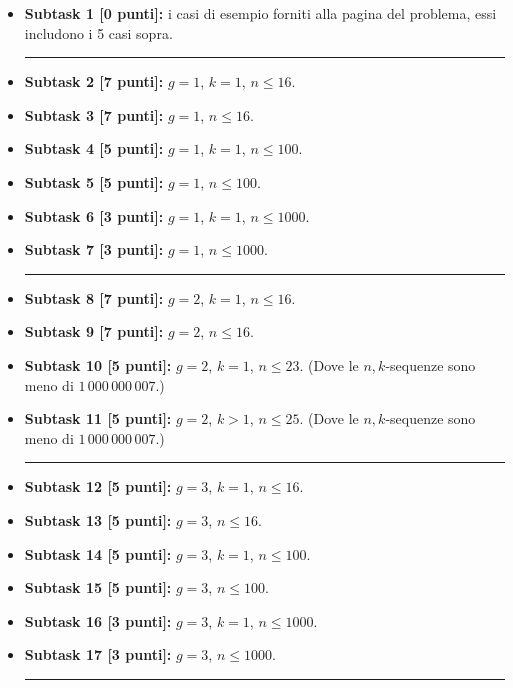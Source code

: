   \begin{itemize}
  \item \textbf{Subtask 1 [0 punti]:} i casi di esempio forniti alla pagina del problema, essi includono i 5 casi sopra.
      \vspace{-0.6cm}
       \begin{center}
      \rule{0.5\textwidth}{0.4pt} \hfill  \hfill \hfill
       \end{center}
      \vspace{-0.6cm}      
    \item \textbf{Subtask 2 [7 punti]:} $g=1$, $k=1$, $n \le 16$.
    \item \textbf{Subtask 3 [7 punti]:} $g=1$, $n \le 16$.
    \item \textbf{Subtask 4 [5 punti]:} $g=1$, $k=1$, $n \le 100$.
    \item \textbf{Subtask 5 [5 punti]:} $g=1$, $n \le 100$.
    \item \textbf{Subtask 6 [3 punti]:} $g=1$, $k=1$, $n \le 1000$.
    \item \textbf{Subtask 7 [3 punti]:} $g=1$, $n \le 1000$.
      \vspace{-0.6cm}
       \begin{center}
      \rule{0.5\textwidth}{0.4pt} \hfill  \hfill \hfill
       \end{center}
      \vspace{-0.6cm}      

    \item \textbf{Subtask 8 [7 punti]:} $g=2$, $k=1$, $n \le 16$.
    \item \textbf{Subtask 9 [7 punti]:} $g=2$, $n \le 16$.
    \item \textbf{Subtask 10 [5 punti]:} $g=2$, $k=1$, $n \le 23$. (Dove le $n,k$-sequenze sono meno di $1\,000\,000\,007$.)
    \item \textbf{Subtask 11 [5 punti]:} $g=2$, $k>1$, $n \le 25$. (Dove le $n,k$-sequenze sono meno di $1\,000\,000\,007$.)
      \vspace{-0.6cm}
       \begin{center}
      \rule{0.5\textwidth}{0.4pt} \hfill  \hfill \hfill
       \end{center}
      \vspace{-0.6cm}      

    \item \textbf{Subtask 12 [5 punti]:} $g=3$, $k=1$, $n \le 16$.
    \item \textbf{Subtask 13 [5 punti]:} $g=3$, $n \le 16$.
    \item \textbf{Subtask 14 [5 punti]:} $g=3$, $k=1$, $n \le 100$.
    \item \textbf{Subtask 15 [5 punti]:} $g=3$, $n \le 100$.
    \item \textbf{Subtask 16 [3 punti]:} $g=3$, $k=1$, $n \le 1000$.
    \item \textbf{Subtask 17 [3 punti]:} $g=3$, $n \le 1000$.
      \vspace{-0.6cm}
       \begin{center}
      \rule{0.5\textwidth}{0.4pt} \hfill  \hfill \hfill
       \end{center}
      \vspace{-0.6cm}      


\end{itemize}
